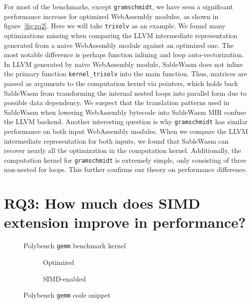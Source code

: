 For most of the benchmarks, except \texttt{gramschmidt}, we have seen a significant performance increase for optimized WebAssembly modules, as shown in figure~\ref{fig:rq2}. Here we will take \texttt{trisolv} as an example. We found many optimizations missing when comparing the LLVM intermediate representation generated from a naive WebAssembly module against an optimized one. The most notable difference is perhaps function inlining and loop auto-vectorization. In LLVM generated by naive WebAssembly module, SableWasm does not inline the primary function \texttt{kernel\_trisolv} into the main function. Thus, matrices are passed as arguments to the computation kernel via pointers, which holds back SableWasm from transforming the internal nested loops into parallel form due to possible data dependency. We suspect that the translation patterns used in SableWasm when lowering WebAssembly bytecode into SableWasm MIR confuse the LLVM backend. Another interesting question is why \texttt{gramschmidt} has similar performance on both input WebAssembly modules. When we compare the LLVM intermediate representation for both inputs, we found that SableWasm can recover nearly all the optimization in the computation kernel. Additionally, the computation kernel for \texttt{gramschmidt} is extremely simple, only consisting of three non-nested for loops. This further confirms our theory on performance difference.

\section[RQ3: How much does SIMD extension improve in performance?]{
  {\large RQ3: How much does SIMD extension improve in performance?}}

\begin{figure}
    
    \caption{Polybench \texttt{gemm} benchmark kernel}
    \label{fig:polybench-gemm-kernel}
\end{figure}

\begin{figure}
    \centering
    \begin{subfigure}{\textwidth}
        
        \caption{Optimized}
        \label{fig:polybench-gemm-opt-code}
    \end{subfigure}
    \begin{subfigure}{\textwidth}
        
        \caption{SIMD-enabled}
        \label{fig:polybench-gemm-simd-code}
    \end{subfigure}
    \caption{Polybench \texttt{gemm} code snippet}
\end{figure}


